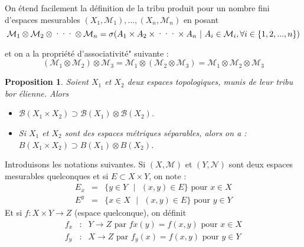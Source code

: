 \documentclass[3pt]{article}
\newtheorem{proposition}[theorem]{Proposition}
\begin{document}
\bigskip

On \'{e}tend facilement la d\'{e}finition de la tribu produit pour un nombre
fini d'espaces mesurables $(X_{1},\mathcal{M}_{1}),...,(X_{n},\mathcal{M}%
_{n})$ en posant%
\begin{equation*}
\mathcal{M}_{1}\otimes \mathcal{M}_{2}\otimes \text{\textperiodcentered
\textperiodcentered \textperiodcentered }\otimes \mathcal{M}_{n}=\sigma
(A_{1}\times A_{2}\times \text{\textperiodcentered \textperiodcentered
\textperiodcentered }\times A_{n}\text{ }|\text{ }A_{i}\in \mathcal{M}%
_{i},\forall i\in \{1,2,...,n\})
\end{equation*}

et on a la propri\'{e}t\'{e} d'associativit\'{e}" suivante :%
\begin{equation*}
(\mathcal{M}_{1}\otimes \mathcal{M}_{2})\otimes \mathcal{M}_{3}=\mathcal{M}%
_{1}\otimes (\mathcal{M}_{2}\otimes \mathcal{M}_{3})=\mathcal{M}_{1}\otimes 
\mathcal{M}_{2}\otimes \mathcal{M}_{3}
\end{equation*}

\bigskip

\begin{proposition}
Soient $X_{1}$ et $X_{2}$ deux espaces topologiques, munis de leur tribu bor%
\'{e}lienne. Alors

\begin{itemize}
\item $\mathcal{B}(X_{1}\times X_{2})\supset \mathcal{B}(X_{1})\otimes 
\mathcal{B}(X_{2})$.

\item Si $X_{1}$ et $X_{2}$ sont des espaces m\'{e}triques s\'{e}parables,
alors on a :$B(X_{1}\times X_{2})\supset B(X_{1})\otimes B(X_{2})$.
\end{itemize}
\end{proposition}

\bigskip

Introduisons les notations suivantes. Si $(X,\mathcal{M})$ et $(Y,\mathcal{N}%
)$ sont deux espaces mesurables quelconques et si $E\subset X\times Y$, on
note :%
\begin{eqnarray*}
E_{x} &=&\{y\in Y\text{ }|\text{ }(x,y)\in E\}\text{ pour }x\in X \\
E^{y} &=&\{x\in X\text{ }|\text{ }(x,y)\in E\}\text{ pour }y\in Y
\end{eqnarray*}%
Et si $f:X\times Y\rightarrow Z$ (espace quelconque), on d\'{e}finit 
\begin{eqnarray*}
f_{x} &:&Y\rightarrow Z\text{ par }fx(y)=f(x,y)\text{ pour }x\in X \\
f_{y} &:&X\rightarrow Z\text{ par }f_{y}(x)=f(x,y)\text{ pour }y\in Y
\end{eqnarray*}
\end{document}
